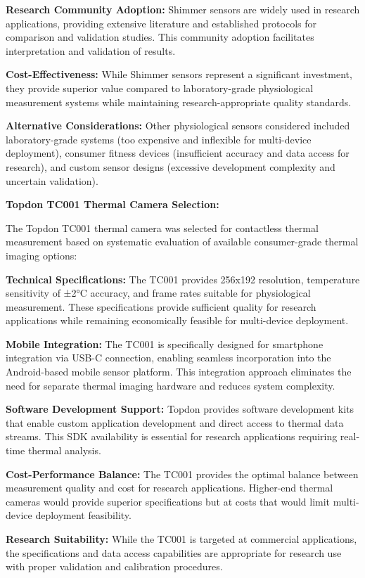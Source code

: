 \documentclass[12pt,a4paper]{report}
\begin{document}
\textbf{Research Community Adoption:} Shimmer sensors are widely used in research applications, providing extensive
literature and established protocols for comparison and validation studies. This community adoption facilitates
interpretation and validation of results.

\textbf{Cost-Effectiveness:} While Shimmer sensors represent a significant investment, they provide superior value compared
to laboratory-grade physiological measurement systems while maintaining research-appropriate quality standards.

\textbf{Alternative Considerations:} Other physiological sensors considered included laboratory-grade systems (too expensive
and inflexible for multi-device deployment), consumer fitness devices (insufficient accuracy and data access for
research), and custom sensor designs (excessive development complexity and uncertain validation).

\textbf{Topdon TC001 Thermal Camera Selection:}

The Topdon TC001 thermal camera was selected for contactless thermal measurement based on systematic evaluation of
available consumer-grade thermal imaging options:

\textbf{Technical Specifications:} The TC001 provides 256x192 resolution, temperature sensitivity of ±2°C accuracy, and frame
rates suitable for physiological measurement. These specifications provide sufficient quality for research applications
while remaining economically feasible for multi-device deployment.

\textbf{Mobile Integration:} The TC001 is specifically designed for smartphone integration via USB-C connection, enabling
seamless incorporation into the Android-based mobile sensor platform. This integration approach eliminates the need for
separate thermal imaging hardware and reduces system complexity.

\textbf{Software Development Support:} Topdon provides software development kits that enable custom application development
and direct access to thermal data streams. This SDK availability is essential for research applications requiring
real-time thermal analysis.

\textbf{Cost-Performance Balance:} The TC001 provides the optimal balance between measurement quality and cost for research
applications. Higher-end thermal cameras would provide superior specifications but at costs that would limit
multi-device deployment feasibility.

\textbf{Research Suitability:} While the TC001 is targeted at commercial applications, the specifications and data access
capabilities are appropriate for research use with proper validation and calibration procedures.
\end{document}
